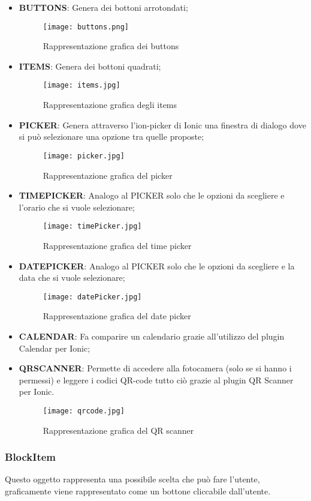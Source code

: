 \begin{itemize}
	\item \textbf{BUTTONS}: Genera dei bottoni arrotondati;
	\begin{figure}[h]
		\centering
		\texttt{[image: buttons.png]}
	\caption{Rappresentazione grafica dei buttons}
	\end{figure}
	\clearpage
	\item \textbf{ITEMS}: Genera dei bottoni quadrati;
	\begin{figure}[h]
		\centering
		\texttt{[image: items.jpg]}
		\caption{Rappresentazione grafica degli items}
	\end{figure}
	\item \textbf{PICKER}: Genera attraverso l'ion-picker di \textsf{Ionic} una finestra di dialogo dove si può selezionare una opzione tra quelle proposte;
	\begin{figure}[h]
		\centering
		\texttt{[image: picker.jpg]}
		\caption{Rappresentazione grafica del picker}
	\end{figure}
	\item \textbf{TIMEPICKER}: Analogo al PICKER solo che le opzioni da scegliere e l'orario che si vuole selezionare;
	\begin{figure}[h]
		\centering
		\texttt{[image: timePicker.jpg]}
		\caption{Rappresentazione grafica del time picker}\label{fig:time}
	\end{figure}
\clearpage
	\item \textbf{DATEPICKER}: Analogo al PICKER solo che le opzioni da scegliere e la data che si vuole selezionare;
	\begin{figure}[h]
		\centering
		\texttt{[image: datePicker.jpg]}
		\caption{Rappresentazione grafica del date picker}\label{fig:date}
	\end{figure}
	\item \textbf{CALENDAR}: Fa comparire un calendario grazie all'utilizzo del plugin Calendar per Ionic;
	\item \textbf{QRSCANNER}: Permette di accedere alla fotocamera (solo se si hanno i permessi) e leggere i codici QR-code tutto ciò grazie al plugin QR Scanner per Ionic.
	\begin{figure}[h]
		\centering
		\texttt{[image: qrcode.jpg]}
		\caption{Rappresentazione grafica del QR scanner}\label{fig:qrc}
	\end{figure}
\end{itemize}

\subsubsection*{BlockItem}
Questo oggetto rappresenta una possibile scelta che può fare l'utente, graficamente viene rappresentato come un bottone cliccabile dall'utente.

